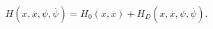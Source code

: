 \begin{equation}
H(x,\stackrel{.}{x},\psi ,\stackrel{.}{\psi })=H_{0}(x,\stackrel{.}{x}%
)+H_{D}(x,\stackrel{.}{x},\psi ,\stackrel{.}{\psi }).
\end{equation}

